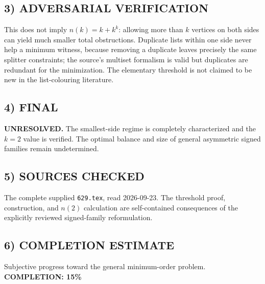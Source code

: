 \subsection*{3) ADVERSARIAL VERIFICATION}
This does not imply $n(k)=k+k^k$: allowing more than $k$ vertices on both sides can yield much smaller total obstructions. Duplicate lists within one side never help a minimum witness, because removing a duplicate leaves precisely the same splitter constraints; the source's multiset formalism is valid but duplicates are redundant for the minimization. The elementary threshold is not claimed to be new in the list-colouring literature.
\subsection*{4) FINAL}
\textbf{UNRESOLVED.} The smallest-side regime is completely characterized and the $k=2$ value is verified. The optimal balance and size of general asymmetric signed families remain undetermined.
\subsection*{5) SOURCES CHECKED}
The complete supplied \texttt{629.tex}, read 2026-09-23. The threshold proof, construction, and $n(2)$ calculation are self-contained consequences of the explicitly reviewed signed-family reformulation.
\subsection*{6) COMPLETION ESTIMATE}
Subjective progress toward the general minimum-order problem.
\textbf{COMPLETION: 15\%}
